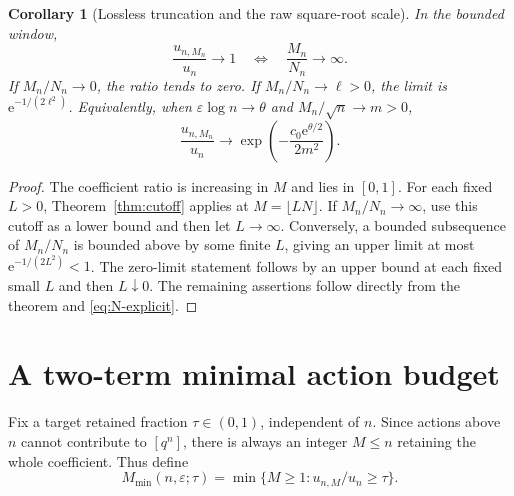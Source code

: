 \documentclass[11pt,a4paper]{article}
\numberwithin{equation}{section}
\newtheorem{corollary}[theorem]{Corollary}
\theoremstyle{definition}
\theoremstyle{remark}
\newcommand{\eps}{\varepsilon}
\newcommand{\ee}{\mathrm e}
\begin{document}
\begin{corollary}[Lossless truncation and the raw square-root scale]
\label{cor:lossless}
In the bounded window,
\begin{equation}
 \frac{u_{n,M_n}}{u_n}\longrightarrow1
 \quad\Longleftrightarrow\quad \frac{M_n}{N_n}\longrightarrow\infty.
 \label{eq:iff-lossless}
\end{equation}
If \(M_n/N_n\to0\), the ratio tends to zero. If \(M_n/N_n\to\ell>0\),
the limit is \(\ee^{-1/(2\ell^2)}\). Equivalently, when
\(\eps\log n\to\theta\) and \(M_n/\sqrt n\to m>0\),
\begin{equation}
 \frac{u_{n,M_n}}{u_n}\longrightarrow
 \exp\left(-\frac{c_0\ee^{\theta/2}}{2m^2}\right).
 \label{eq:raw-cutoff}
\end{equation}
\end{corollary}
\begin{proof}
The coefficient ratio is increasing in \(M\) and lies in \([0,1]\).
For each fixed \(L>0\), Theorem~\ref{thm:cutoff} applies at
\(M=\lfloor LN\rfloor\). If \(M_n/N_n\to\infty\), use this cutoff as
a lower bound and then let \(L\to\infty\). Conversely, a bounded
subsequence of \(M_n/N_n\) is bounded above by some finite \(L\), giving
an upper limit at most \(\ee^{-1/(2L^2)}<1\).
The zero-limit statement follows by an upper bound at each fixed small
\(L\) and then \(L\downarrow0\). The remaining assertions follow directly
from the theorem and \eqref{eq:N-explicit}.
\end{proof}

\section{A two-term minimal action budget}
\label{sec:budget}

Fix a target retained fraction \(\tau\in(0,1)\), independent of \(n\).
Since actions above \(n\) cannot contribute to \([q^n]\), there is always
an integer \(M\le n\) retaining the whole coefficient. Thus define
\begin{equation}
 M_{\min}(n,\eps;\tau)=\min\{M\ge1:u_{n,M}/u_n\ge\tau\}.
 \label{eq:min-budget}
\end{equation}
\end{document}
